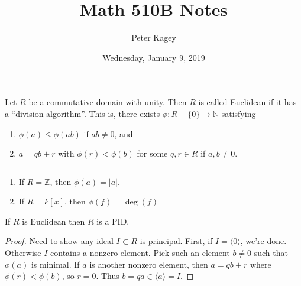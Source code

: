\documentclass{article}
\newenvironment{definition}[1][Definition.]{
  \begin{trivlist} \item[\hskip \labelsep {\bfseries #1}]
}{\end{trivlist}}
\newenvironment{example}[1][Example.]{
  \begin{trivlist} \item[\hskip \labelsep {\bfseries #1}]
}{\end{trivlist}}
\newenvironment{theorem}[1][Theorem.]{
  \begin{trivlist} \item[\hskip \labelsep {\bfseries #1}]
}{\end{trivlist}}
\newcommand{\set}[1]{\{ #1 \}}
\newcommand{\ang}[1]{\langle #1 \rangle}
\newcommand{\fn}[3]{#1 \colon #2 \rightarrow #3}
\begin{document}
\title{Math 510B Notes}
\author{Peter Kagey}
\date{Wednesday, January 9, 2019}

\maketitle

\begin{definition}
  Let $R$ be a commutative domain with unity. Then $R$ is called Euclidean if it
  has a ``division algorithm''. This is, there exists
  $\fn{\phi}{R - \set 0}{\mathbb N}$ satisfying \begin{enumerate}
    \item $\phi(a) \leq \phi(ab)$ if $ab \neq 0$, and
    \item $a = qb + r$ with $\phi(r) < \phi(b)$ for some $q, r \in R$ if $a, b \neq 0$.
  \end{enumerate}
\end{definition}

\begin{example}[Examples.] $ $
  \begin{enumerate}
    \item If $R = \mathbb Z$, then $\phi(a) = |a|$.
    \item If $R = k[x]$, then $\phi(f) = \deg(f)$
  \end{enumerate}
\end{example}

\begin{theorem}[Lemma.]
  If $R$ is Euclidean then $R$ is a PID.
\end{theorem}
\begin{proof}
  Need to show any ideal $I \subset R$ is principal.
  First, if $I = \ang 0$, we're done. Otherwise $I$ contains a nonzero element.
  Pick such an element $b \neq 0$ such that $\phi(a)$ is minimal. If $a$ is
  another nonzero element, then $a = qb + r$ where $\phi(r) < \phi(b)$, so
  $r = 0$. Thus $b = qa \in \ang a = I$.
\end{proof}
\end{document}
